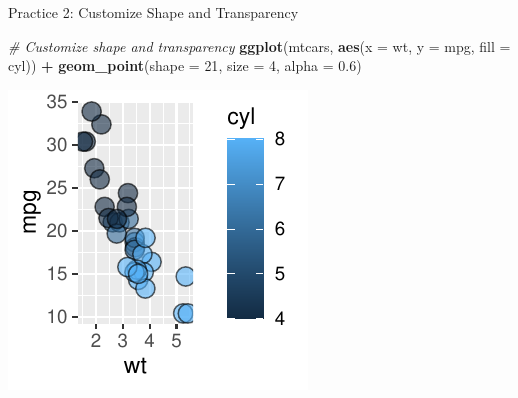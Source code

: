 \documentclass[
  ignorenonframetext,
]{beamer}
\newenvironment{Shaded}{\begin{snugshade}}{\end{snugshade}}
\newcommand{\AttributeTok}[1]{\textcolor[rgb]{0.13,0.29,0.53}{#1}}
\newcommand{\CommentTok}[1]{\textcolor[rgb]{0.56,0.35,0.01}{\textit{#1}}}
\newcommand{\DecValTok}[1]{\textcolor[rgb]{0.00,0.00,0.81}{#1}}
\newcommand{\FloatTok}[1]{\textcolor[rgb]{0.00,0.00,0.81}{#1}}
\newcommand{\FunctionTok}[1]{\textcolor[rgb]{0.13,0.29,0.53}{\textbf{#1}}}
\newcommand{\NormalTok}[1]{#1}
\newcommand{\SpecialCharTok}[1]{\textcolor[rgb]{0.81,0.36,0.00}{\textbf{#1}}}
\begin{document}
\begin{frame}[fragile]{Practice 2: Customize Shape and Transparency}
\label{practice-2-customize-shape-and-transparency-1}

\begin{Shaded}
\begin{Highlighting}[]
\CommentTok{\# Customize shape and transparency}
\FunctionTok{ggplot}\NormalTok{(mtcars, }\FunctionTok{aes}\NormalTok{(}\AttributeTok{x =}\NormalTok{ wt, }\AttributeTok{y =}\NormalTok{ mpg, }\AttributeTok{fill =}\NormalTok{ cyl)) }\SpecialCharTok{+} \FunctionTok{geom\_point}\NormalTok{(}\AttributeTok{shape =} \DecValTok{21}\NormalTok{,}
    \AttributeTok{size =} \DecValTok{4}\NormalTok{, }\AttributeTok{alpha =} \FloatTok{0.6}\NormalTok{)}
\end{Highlighting}
\end{Shaded}

\begin{center}\includegraphics[width=0.5\linewidth]{Figs/unnamed-chunk-15-1} \end{center}
\end{frame}
\end{document}
